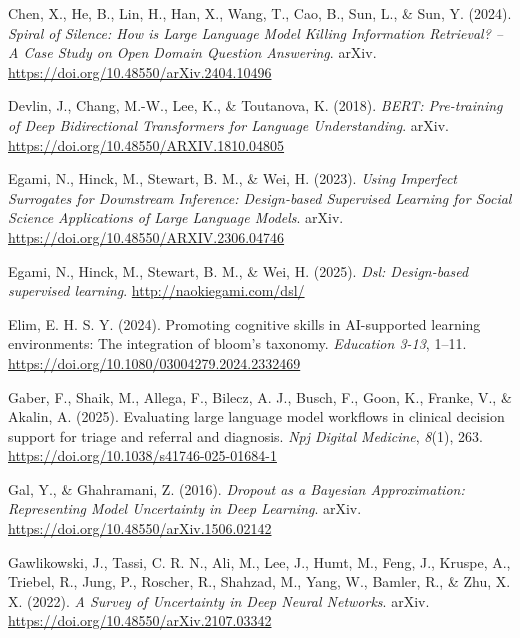 \documentclass[
  12pt,
]{article}
\newlength{\cslhangindent}
\newenvironment{CSLReferences}[2] %
 {\begin{list}{}{%
  \setlength{\itemindent}{0pt}
  \setlength{\leftmargin}{0pt}
  \setlength{\parsep}{0pt}
  \ifodd #1
   \setlength{\leftmargin}{\cslhangindent}
   \setlength{\itemindent}{-1\cslhangindent}
  \fi
  \setlength{\itemsep}{#2\baselineskip}}}
 {\end{list}}
\begin{document}
\begin{CSLReferences}{1}{0}
Chen, X., He, B., Lin, H., Han, X., Wang, T., Cao, B., Sun, L., \& Sun, Y. (2024). \emph{Spiral of {Silence}: {How} is {Large} {Language} {Model} {Killing} {Information} {Retrieval}? -- {A} {Case} {Study} on {Open} {Domain} {Question} {Answering}}. arXiv. \url{https://doi.org/10.48550/arXiv.2404.10496}

Devlin, J., Chang, M.-W., Lee, K., \& Toutanova, K. (2018). \emph{{BERT}: {Pre}-training of {Deep} {Bidirectional} {Transformers} for {Language} {Understanding}}. arXiv. \url{https://doi.org/10.48550/ARXIV.1810.04805}

Egami, N., Hinck, M., Stewart, B. M., \& Wei, H. (2023). \emph{Using {Imperfect} {Surrogates} for {Downstream} {Inference}: {Design}-based {Supervised} {Learning} for {Social} {Science} {Applications} of {Large} {Language} {Models}}. arXiv. \url{https://doi.org/10.48550/ARXIV.2306.04746}

Egami, N., Hinck, M., Stewart, B. M., \& Wei, H. (2025). \emph{Dsl: Design-based supervised learning}. \url{http://naokiegami.com/dsl/}

Elim, E. H. S. Y. (2024). Promoting cognitive skills in {AI}-supported learning environments: The integration of bloom's taxonomy. \emph{Education 3-13}, 1--11. \url{https://doi.org/10.1080/03004279.2024.2332469}

Gaber, F., Shaik, M., Allega, F., Bilecz, A. J., Busch, F., Goon, K., Franke, V., \& Akalin, A. (2025). Evaluating large language model workflows in clinical decision support for triage and referral and diagnosis. \emph{Npj Digital Medicine}, \emph{8}(1), 263. \url{https://doi.org/10.1038/s41746-025-01684-1}

Gal, Y., \& Ghahramani, Z. (2016). \emph{Dropout as a {Bayesian} {Approximation}: {Representing} {Model} {Uncertainty} in {Deep} {Learning}}. arXiv. \url{https://doi.org/10.48550/arXiv.1506.02142}

Gawlikowski, J., Tassi, C. R. N., Ali, M., Lee, J., Humt, M., Feng, J., Kruspe, A., Triebel, R., Jung, P., Roscher, R., Shahzad, M., Yang, W., Bamler, R., \& Zhu, X. X. (2022). \emph{A {Survey} of {Uncertainty} in {Deep} {Neural} {Networks}}. arXiv. \url{https://doi.org/10.48550/arXiv.2107.03342}


\end{CSLReferences}
\end{document}

